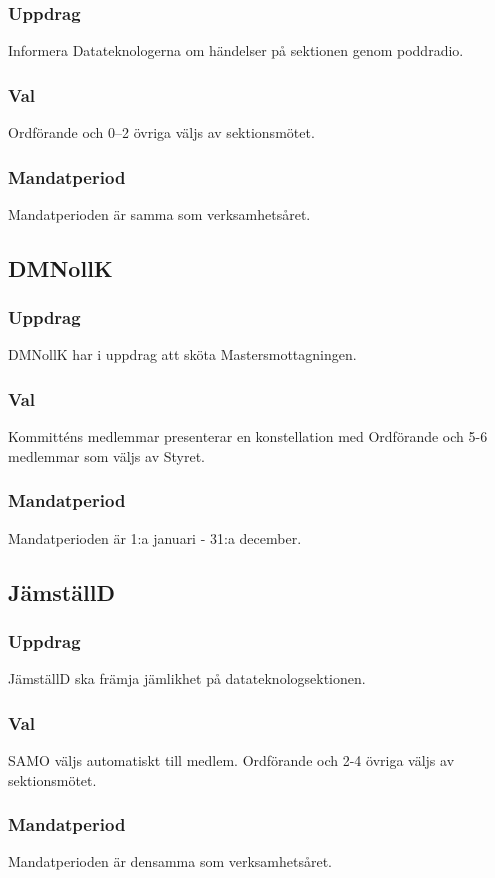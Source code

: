\subsubsection{Uppdrag}
Informera Datateknologerna om händelser på sektionen genom poddradio.
\subsubsection{Val}
Ordförande och 0–2 övriga väljs av sektionsmötet.
\subsubsection{Mandatperiod}
Mandatperioden är samma som verksamhetsåret.

\subsection{DMNollK}
\subsubsection{Uppdrag}
DMNollK har i uppdrag att sköta Mastersmottagningen.
\subsubsection{Val}
Kommitténs medlemmar presenterar en konstellation med Ordförande och 5-6 medlemmar som väljs av Styret.
\subsubsection{Mandatperiod}
Mandatperioden är 1:a januari - 31:a december.

\subsection{JämställD}
\subsubsection{Uppdrag}
JämställD ska främja jämlikhet på datateknologsektionen.
\subsubsection{Val}
SAMO väljs automatiskt till medlem. Ordförande och 2-4 övriga väljs av sektionsmötet.
\subsubsection{Mandatperiod}
Mandatperioden är densamma som verksamhetsåret.

